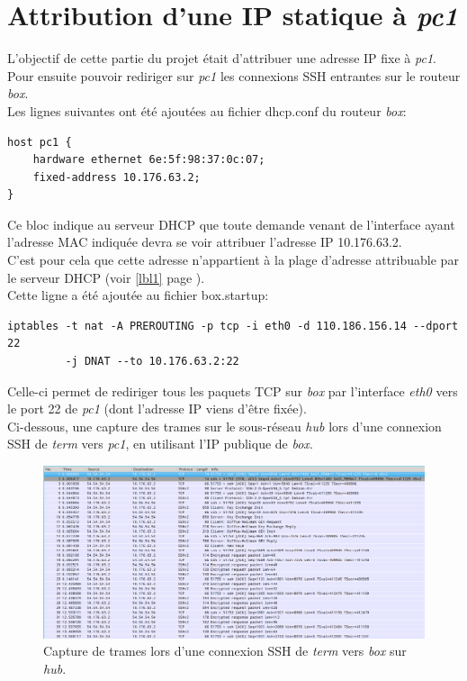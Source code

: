 \documentclass[12pt,a4paper,utf8x]{report}
\begin{document}
\section[Configuration statique de \emph{pc1}]{Attribution d'une IP statique à \emph{pc1}}
L'objectif de cette partie du projet était d'attribuer une adresse IP fixe à \emph{pc1}. Pour ensuite pouvoir rediriger sur \emph{pc1} les connexions SSH entrantes sur le routeur \emph{box}.\\
Les lignes suivantes ont été ajoutées au fichier dhcp.conf du routeur \emph{box}:
\begin{verbatim}
host pc1 {
	hardware ethernet 6e:5f:98:37:0c:07;
	fixed-address 10.176.63.2;
}
\end{verbatim}
Ce bloc indique au serveur DHCP que toute demande venant de l'interface ayant l'adresse MAC indiquée devra se voir attribuer l'adresse IP 10.176.63.2.\\
C'est pour cela que cette adresse n'appartient à la plage d'adresse attribuable par le serveur DHCP (voir \ref{lbl1} page \pageref{lbl1}).\\
Cette ligne a été ajoutée au fichier box.startup:
\begin{verbatim}
iptables -t nat -A PREROUTING -p tcp -i eth0 -d 110.186.156.14 --dport 22
         -j DNAT --to 10.176.63.2:22
\end{verbatim}
Celle-ci permet de rediriger tous les paquets TCP sur \emph{box} par l'interface \emph{eth0} vers le port 22 de \emph{pc1} (dont l'adresse IP viens d'être fixée).\\
Ci-dessous, une capture des trames sur le sous-réseau \emph{hub} lors d'une connexion SSH de \emph{term} vers \emph{pc1}, en utilisant l'IP publique de \emph{box}.
\begin{figure}[h!]
\includegraphics[width=1\textwidth]{SSHHub.png}
\caption{Capture de trames lors d'une connexion SSH de \emph{term} vers \emph{box} sur \emph{hub}.}
\end{figure}
\clearpage
\end{document}
